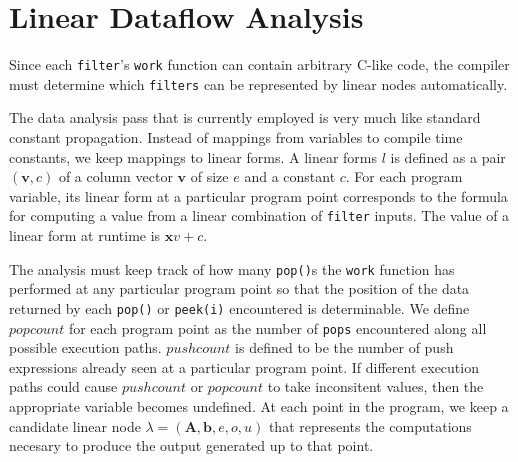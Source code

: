\section{Linear Dataflow Analysis}
\label{sec:dataflow}

%
%
%



Since each {\tt filter}'s {\tt work} function can contain arbitrary C-like code,
the compiler must determine which {\tt filters} can be represented by linear nodes
automatically. 
 
The data analysis pass that is currently employed is very much like standard constant propagation. 
Instead of mappings from variables to compile time constants, we keep mappings to linear forms.
A linear forms $l$ is defined as a pair $({\mathbf v}, c)$ of a column vector $\mathbf{v}$ of size $e$ 
and a constant $c$. For each program variable, its linear form at a particular program 
point corresponds to the formula for computing a value from a linear 
combination of {\tt filter} inputs. The value of a linear form at runtime is 
${\mathbf xv} + c$.

The analysis must keep track of how many {\tt pop()}s the {\tt work} 
function has performed at any particular program point so that 
the position of the data returned by each {\tt pop()} or {\tt peek(i)} 
encountered is determinable. We define $popcount$ for each program point 
as the number of {\tt pops} encountered along all possible
execution paths. 
$pushcount$ is defined to be the number of push expressions already
seen at a particular program point.
If different execution paths could cause $pushcount$ or 
$popcount$ to take inconsitent values, then the appropriate
variable becomes undefined.
At each point in the program, we keep a candidate linear node 
$\lambda=({\mathbf A}, {\mathbf b}, e,o,u)$ that represents the 
computations necesary to produce the output generated up to that 
point.

